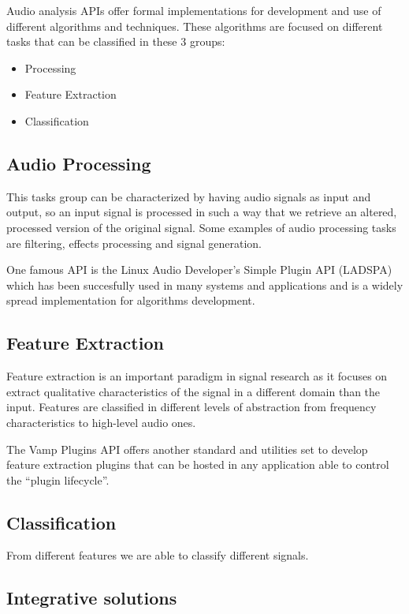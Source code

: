 \documentclass{llncs}
\begin{document}
Audio analysis  APIs offer formal implementations for development and use of different algorithms and techniques. These algorithms are focused on different tasks that can be classified in these 3 groups:

\begin{itemize}
 \item Processing
 \item Feature Extraction
 \item Classification
\end{itemize}

\subsection{Audio Processing}

This tasks group can be characterized by having audio signals as input and output, so an input signal is processed in such a way that we retrieve an altered, processed version of the original signal. Some examples of audio processing tasks are filtering, effects processing and signal generation.

One famous API is the Linux Audio Developer's Simple Plugin API (LADSPA) which has been succesfully used in many systems and applications and is a widely spread implementation for algorithms development.

\subsection{Feature Extraction}

Feature extraction is an important paradigm in signal research as it focuses on extract qualitative characteristics of the signal in a different domain than the input. Features are classified in different levels of abstraction from frequency characteristics to high-level audio ones.

The Vamp Plugins API offers another standard and utilities set to develop feature extraction plugins that can be hosted in any application able to control the ``plugin lifecycle''.

\subsection{Classification}

From different features we are able to classify different signals. 

\subsection{Integrative solutions}
\end{document}
